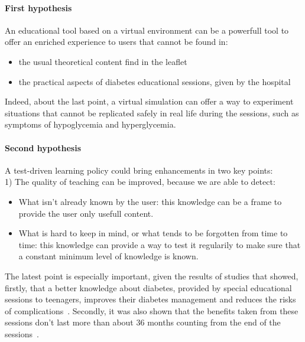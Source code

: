 \documentclass[12pt,MSc]{muthesis}
\begin{document}
\paragraph{First hypothesis}An educational tool based on a virtual environment can be a powerfull tool to offer an enriched experience to users
that cannot be found in:
\begin{itemize}
\item the usual theoretical content find in the leaflet 
\item the practical aspects of diabetes educational sessions, given by the hospital 
\end{itemize}
Indeed, about the last point, a virtual simulation can offer a way to experiment situations that cannot be replicated safely in real life during the sessions, such as symptoms of hypoglycemia and hyperglycemia.

\paragraph{Second hypothesis}A test-driven learning policy could bring enhancements in two key points:\\
1) The quality of teaching can be improved, because we are able to detect:
\begin{itemize}
\item What isn't already known by the user: this knowledge can be a frame to provide the user only usefull content.
\item What is hard to keep in mind, or what tends to be forgotten from time to time: this knowledge can provide a way to test it regularily to make sure that a constant minimum level of knowledge is known.
\end{itemize}


The latest point is especially important, given the results of studies that showed, firstly, that a better knowledge about diabetes, provided by special educational sessions to teenagers, improves their diabetes management and reduces the risks of complications~\cite{}. Secondly, it was also shown that the benefits taken from these sessions don't last more than about 36 months counting from the end of the sessions~\cite{}. 
\end{document}
